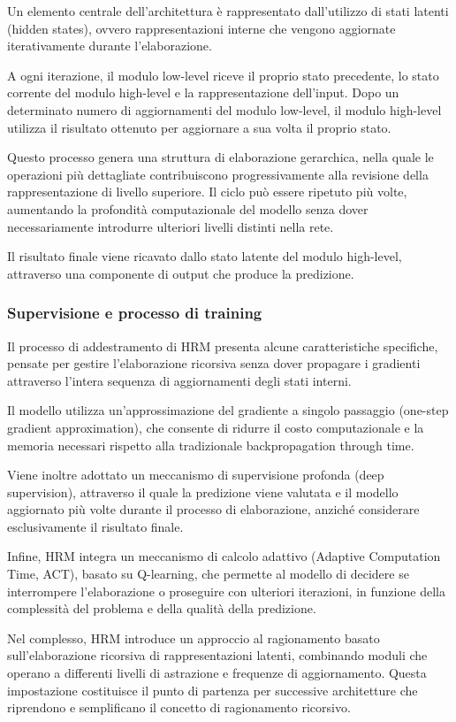 Un elemento centrale dell'architettura è rappresentato dall'utilizzo di stati latenti (hidden states), ovvero rappresentazioni interne che vengono aggiornate iterativamente durante l'elaborazione.

A ogni iterazione, il modulo low-level riceve il proprio stato precedente, lo stato corrente del modulo high-level e la rappresentazione dell'input. Dopo un determinato numero di aggiornamenti del modulo low-level, il modulo high-level utilizza il risultato ottenuto per aggiornare a sua volta il proprio stato.

Questo processo genera una struttura di elaborazione gerarchica, nella quale le operazioni più dettagliate contribuiscono progressivamente alla revisione della rappresentazione di livello superiore. Il ciclo può essere ripetuto più volte, aumentando la profondità computazionale del modello senza dover necessariamente introdurre ulteriori livelli distinti nella rete.

Il risultato finale viene ricavato dallo stato latente del modulo high-level, attraverso una componente di output che produce la predizione.

\subsubsection{Supervisione e processo di training}

Il processo di addestramento di HRM presenta alcune caratteristiche specifiche, pensate per gestire l'elaborazione ricorsiva senza dover propagare i gradienti attraverso l'intera sequenza di aggiornamenti degli stati interni.

Il modello utilizza un'approssimazione del gradiente a singolo passaggio (one-step gradient approximation), che consente di ridurre il costo computazionale e la memoria necessari rispetto alla tradizionale backpropagation through time.

Viene inoltre adottato un meccanismo di supervisione profonda (deep supervision), attraverso il quale la predizione viene valutata e il modello aggiornato più volte durante il processo di elaborazione, anziché considerare esclusivamente il risultato finale.

Infine, HRM integra un meccanismo di calcolo adattivo (Adaptive Computation Time, ACT), basato su Q-learning, che permette al modello di decidere se interrompere l'elaborazione o proseguire con ulteriori iterazioni, in funzione della complessità del problema e della qualità della predizione.

Nel complesso, HRM introduce un approccio al ragionamento basato sull'elaborazione ricorsiva di rappresentazioni latenti, combinando moduli che operano a differenti livelli di astrazione e frequenze di aggiornamento. Questa impostazione costituisce il punto di partenza per successive architetture che riprendono e semplificano il concetto di ragionamento ricorsivo.